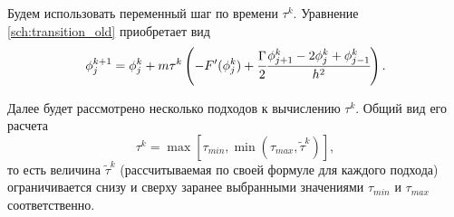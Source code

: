 Будем использовать переменный шаг по времени $\tau^k$. Уравнение \eqref{sch:transition_old} приобретает вид
\begin{equation}
	\phi_j^{k + 1} = \phi_j^k + m \tau^k \left( -F'(\phi_j^k) + \cfrac{\Gamma}{2} \cfrac{{\phi}_{j + 1}^k - 2 {\phi}_j^k + {\phi}_{j - 1}^k}{h^2} \right).
	\label{sch:transition}
\end{equation}

Далее будет рассмотрено несколько подходов к вычислению $\tau^k$. Общий вид его расчета
\begin{equation}
	\tau^k = \max \left[ \tau_{min}, \min( \tau_{max}, \widetilde{\tau}^k) \right],
	\label{sch:time_step_min_max}
\end{equation}
то есть величина $\widetilde{\tau}^k$ (рассчитываемая по своей формуле для каждого подхода) ограничивается снизу и сверху заранее выбранными значениями $\tau_{min}$ и $\tau_{max}$ соответственно.